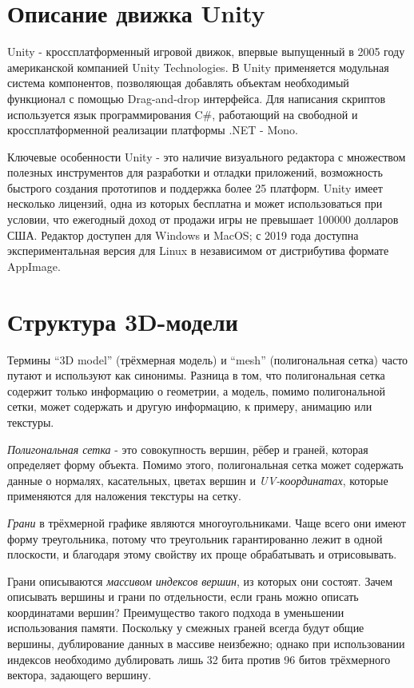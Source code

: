 \section{Описание движка Unity}
Unity - кроссплатформенный игровой движок, впервые выпущенный в 2005 году американской компанией Unity Technologies. В Unity применяется модульная система компонентов, позволяющая добавлять объектам необходимый функционал с помощью Drag-and-drop интерфейса. Для написания скриптов используется язык программирования C\#, работающий на свободной и кроссплатформенной реализации платформы .NET - Mono.

Ключевые особенности Unity - это наличие визуального редактора с множеством полезных инструментов для разработки и отладки приложений, возможность быстрого создания прототипов и поддержка более 25 платформ. Unity имеет несколько лицензий, одна из которых бесплатна и может использоваться при условии, что ежегодный доход от продажи игры не превышает 100000 долларов США. Редактор доступен для Windows и MacOS; с 2019 года доступна экспериментальная версия для Linux в независимом от дистрибутива формате AppImage.

\section{Структура 3D-модели}
Термины ``3D model'' (трёхмерная модель) и ``mesh'' (полигональная сетка) часто путают и используют как синонимы. Разница в том, что полигональная сетка содержит только информацию о геометрии, а модель, помимо полигональной сетки, может содержать и другую информацию, к примеру, анимацию или текстуры.

\emph{Полигональная сетка} - это совокупность вершин, рёбер и граней, которая определяет форму объекта. Помимо этого, полигональная сетка может содержать данные о нормалях, касательных, цветах вершин и \emph{UV-координатах}, которые применяются для наложения текстуры на сетку.

\emph{Грани} в трёхмерной графике являются многоугольниками. Чаще всего они имеют форму треугольника, потому что треугольник гарантированно лежит в одной плоскости, и благодаря этому свойству их проще обрабатывать и отрисовывать. 

Грани описываются \emph{массивом индексов вершин}, из которых они состоят. Зачем описывать вершины и грани по отдельности, если грань можно описать координатами вершин? Преимущество такого подхода в уменьшении использования памяти. Поскольку у смежных граней всегда будут общие вершины, дублирование данных в массиве неизбежно; однако при использовании индексов необходимо дублировать лишь 32 бита против 96 битов трёхмерного вектора, задающего вершину.

